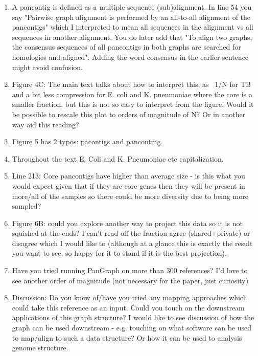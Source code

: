 \documentclass{article}
\begin{document}
\begin{enumerate}
    \item A pancontig is defined as a multiple sequence (sub)alignment. In line 54 you say "Pairwise graph alignment is performed by an all-to-all alignment of the pancontigs" which I interpreted to mean all sequences in the alignment vs all sequences in another alignment. You do later add that "To align two graphs, the consensus sequences of all pancontigs in both graphs are searched for homologies and aligned". Adding the word consensus in the earlier sentence might avoid confusion.

    \item Figure 4C: The main text talks about how to interpret this, as ~1/N for TB and a bit less compression for E. coli and K. pneumoniae where the core is a smaller fraction, but this is not so easy to interpret from the figure. Would it be possible to rescale this plot to orders of magnitude of N? Or in another way aid this reading?

    \item Figure 5 has 2 typos: pacontigs and panconting.

    \item Throughout the text E. Coli and K. Pneumoniae etc capitalization.

    \item Line 213: Core pancontigs have higher than average size - is this what you would expect given that if they are core genes then they will be present in more/all of the samples so there could be more diversity due to being more sampled?

    \item Figure 6B: could you explore another way to project this data so it is not squished at the ends? I can't read off the fraction agree (shared+private) or disagree which I would like to (although at a glance this is exactly the result you want to see, so happy for it to stand if it is the best projection).

    \item Have you tried running PanGraph on more than 300 references? I'd love to see another order of magnitude (not necessary for the paper, just curiosity)

    \item Discussion: Do you know of/have you tried any mapping approaches which could take this reference as an input. Could you touch on the downstream applications of this graph structure? I would like to see discussion of how the graph can be used downstream - e.g. touching on what software can be used to map/align to such a data structure? Or how it can be used to analysis genome structure.


\end{enumerate}
\end{document}
